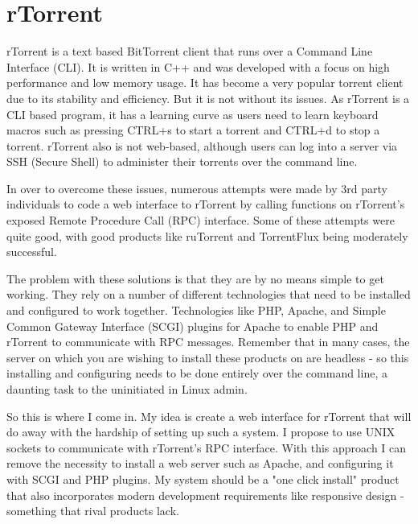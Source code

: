
\section{rTorrent}
rTorrent is a text based BitTorrent client that runs over a Command Line Interface (CLI). It is written in C++ and was developed with a focus on high performance and low memory usage. It has become a very popular torrent client due to its stability and efficiency. But it is not without its issues. As rTorrent is a CLI based program, it has a learning curve as users need to learn keyboard macros such as pressing CTRL+s to start a torrent and CTRL+d to stop a torrent. rTorrent also is not web-based, although users can log into a server via SSH (Secure Shell) to administer their torrents over the command line. 

In over to overcome these issues, numerous attempts were made by 3rd party individuals to code a web interface to rTorrent by calling functions on rTorrent's exposed Remote Procedure Call (RPC) interface. Some of these attempts were quite good, with good products like ruTorrent and TorrentFlux being moderately successful. 

The problem with these solutions is that they are by no means simple to get working. They rely on a number of different technologies that need to be installed and configured to work together. Technologies like PHP, Apache, and Simple Common Gateway Interface (SCGI) plugins for Apache to enable PHP and rTorrent to communicate with RPC messages. Remember that in many cases, the server on which you are wishing to install these products on are headless - so this installing and configuring needs to be done entirely over the command line, a daunting task to the uninitiated in Linux admin. 

So this is where I come in. My idea is create a web interface for rTorrent that will do away with the hardship of setting up such a system. I propose to use UNIX sockets to communicate with rTorrent's RPC interface. With this approach I can remove the necessity to install a web server such as Apache, and configuring it with SCGI and PHP plugins. My system should be a "one click install" product that also incorporates modern development requirements like responsive design - something that rival products lack.













